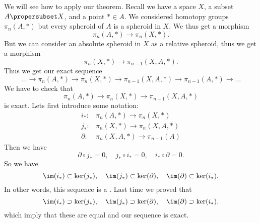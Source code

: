 
We will see how to apply our theorem. Recall we have a space $X$,
a subset $A\propersubset X$, and a point $*\in A$. We considered
homotopy groups $\pi_{n}(A,*)$ but every spheroid of $A$ is a
spheroid in $X$. We thus get a morphism
\begin{equation}
\pi_{n}(A,*)\to\pi_{n}(X,*).
\end{equation}
But we can consider an absolute spheroid in $X$ as a relative
spheroid, thus we get a morphism
\begin{equation}
\pi_{n}(X,*)\to\pi_{n-1}(X,A,*).
\end{equation}
Thus we get our exact sequence
\begin{equation}
\dots\to\pi_{n}(A,*)\to\pi_{n}(X,*)\to\pi_{n-1}(X,A,*)
\to\pi_{n-1}(A,*)\to\dots
\end{equation}
We have to check that
\begin{equation}
\pi_{n}(A,*)\to\pi_{n}(X,*)\to\pi_{n-1}(X,A,*)
\end{equation}
is exact. Lets first introduce some notation:
\begin{subequations}
\begin{align}
i_{*}\colon&\pi_{n}(A,*)\to\pi_{n}(X,*)\\
j_{*}\colon&\pi_{n}(X,*)\to\pi_{n}(X,A,*)\\
\partial\colon&\pi_{n}(X,A,*)\to\pi_{n-1}(A)
\end{align}
\end{subequations}
Then we have
\begin{equation}
\partial\circ j_{*}=0,\quad j_{*}\circ i_{*}=0,\quad
i_{*}\circ\partial=0.
\end{equation}
So we have
\begin{equation}
\im(i_{*})\subset\ker(j_*),\quad\im(j_*)\subset\ker(\partial),\quad
\im(\partial)\subset\ker(i_*).
\end{equation}
In other words, this sequence is a .
Last time we proved that
\begin{equation}
\im(i_{*})\supset\ker(j_*),\quad\im(j_*)\supset\ker(\partial),\quad
\im(\partial)\supset\ker(i_*).
\end{equation}
which imply that these are equal and our sequence is exact.

